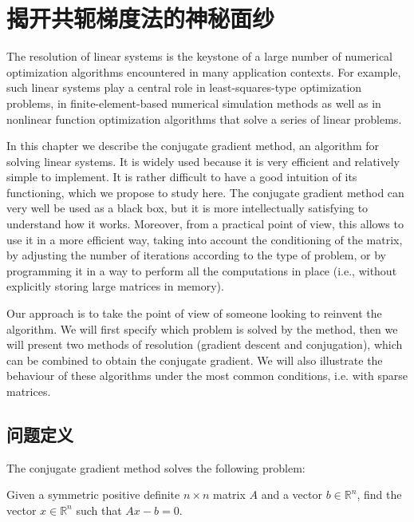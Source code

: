 \documentclass[notitlepage,oneside]{book}
\makeatletter
\newcommand{\authoredby}[1]{\addtocontents{toc}{\protect\@nameuse{authoredby#1}}}%
\makeatother
\begin{document}
\authoredby{A}
\chapter{揭开共轭梯度法的神秘面纱}
\fancyhead[R]{\textcolor{blue}{optional reading}}


The resolution of linear systems is the keystone of a large number of numerical optimization algorithms encountered in many application contexts.
For example, such linear systems play a central role in least-squares-type optimization problems, in
finite-element-based numerical simulation methods as well as in nonlinear function optimization algorithms that solve a series of linear problems.

In this chapter we describe the conjugate gradient method, an algorithm for solving linear systems.
It is widely used because it is very efficient and relatively simple to implement.
It is rather difficult to have a good intuition of its functioning, which we propose to study here.
The conjugate gradient method can very well be used as a black box, but it is more intellectually satisfying to understand how it works.
Moreover, from a practical point of view, this allows to use it in a more efficient way, taking into account the conditioning of the matrix,
by adjusting the number of iterations according to the type of problem, or by programming it in a way to perform all the computations in place
(i.e., without explicitly storing large matrices in memory).

Our approach is to take the point of view of someone looking to reinvent the algorithm.
We will first specify which problem is solved by the method, then we will present two methods of resolution (gradient descent and conjugation),
which can be combined to obtain the conjugate gradient.
We will also illustrate the behaviour of these algorithms under the most common conditions, i.e. with sparse matrices.



\section{问题定义}

The conjugate gradient method solves the following problem:

\begin{framed}
Given  a symmetric positive definite $n\times n$ matrix $A$ and a vector $b \in {\mathbb R}^n$, find the vector $x \in {\mathbb R}^n$ such that $Ax - b =0$.
\end{framed}
\end{document}

